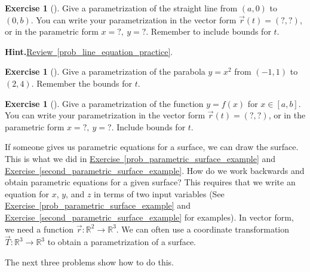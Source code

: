 \documentclass[10pt,]{book}
\theoremstyle{plain}
\theoremstyle{definition}
\theoremstyle{definition}
\theoremstyle{definition}
\theoremstyle{definition}
\newtheorem{exploration}[project]{Exercise}
\theoremstyle{definition}
\numberwithin{equation}{section}
\begin{document}
\begin{exploration}[]\label{exploration-122}
Give a parametrization of the straight line from \((a,0)\) to \((0,b)\). You can write your parametrization in the vector form \(\vec r(t)=(?,?)\), or in the parametric form \(x=?,\ y=?\). Remember to include bounds for \(t\).%
\par\medskip\noindent%
\textbf{Hint.}\quad \hyperref[prob_line_equation_practice]{Review~\ref{prob_line_equation_practice}}.%
\end{exploration}
\begin{exploration}[]\label{exploration-123}
Give a parametrization of the parabola \(y=x^2\) from \((-1,1)\) to \((2,4)\). Remember the bounds for \(t\).%
\end{exploration}
\begin{exploration}[]\label{exploration-124}
Give a parametrization of the function \(y=f(x)\) for \(x\in[a,b]\). You can write your parametrization in the vector form \(\vec r(t)=(?,?)\), or in the parametric form \(x=?,\ y=?\). Include bounds for \(t\).%
\end{exploration}
If someone gives us parametric equations for a surface, we can draw the surface. This is what we did in \hyperref[prob_parametric_surface_example]{Exercise~\ref{prob_parametric_surface_example}} and \hyperref[second_parametric_surface_example]{Exercise~\ref{second_parametric_surface_example}}. How do we work backwards and obtain parametric equations for a given surface? This requires that we write an equation for \(x\), \(y\), and \(z\) in terms of two input variables (See \hyperref[prob_parametric_surface_example]{Exercise~\ref{prob_parametric_surface_example}} and \hyperref[second_parametric_surface_example]{Exercise~\ref{second_parametric_surface_example}} for examples). In vector form, we need a function \(\vec r\colon \mathbb{R}^2\to\mathbb{R}^3\). We can often use a coordinate transformation \(\vec T\colon \mathbb{R}^3\to\mathbb{R}^3\) to obtain a parametrization of a surface.%
\par
The next three problems show how to do this.%
\end{document}

